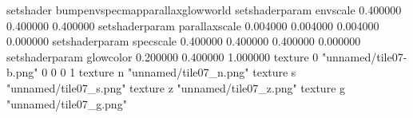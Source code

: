 setshader bumpenvspecmapparallaxglowworld
setshaderparam envscale 0.400000 0.400000 0.400000
setshaderparam parallaxscale 0.004000 0.004000 0.004000 0.000000
setshaderparam specscale 0.400000 0.400000 0.400000 0.000000
setshaderparam glowcolor 0.200000 0.400000 1.000000
texture 0 "unnamed/tile07-b.png" 0 0 0 1
texture n "unnamed/tile07_n.png"
texture s "unnamed/tile07_s.png"
texture z "unnamed/tile07_z.png"
texture g "unnamed/tile07_g.png"